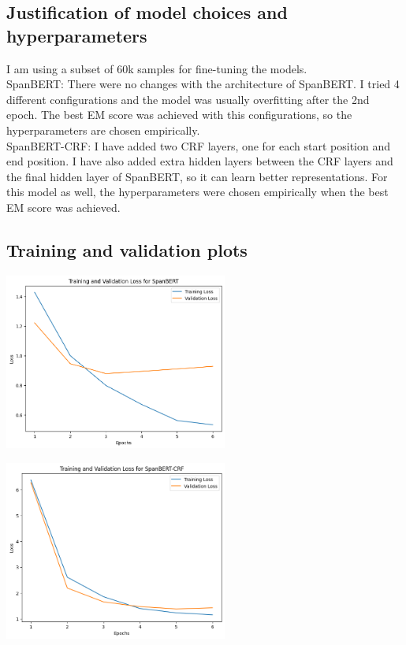 \documentclass{article}
\begin{document}
\subsection{Justification of model choices and hyperparameters}
I am using a subset of 60k samples for fine-tuning the models.
\\
SpanBERT: There were no changes with the architecture of SpanBERT. I tried 4 different configurations and the model was usually overfitting after the 2nd epoch. The best EM score was achieved with this configurations, so the hyperparameters are chosen empirically.
\\
SpanBERT-CRF: I have added two CRF layers, one for each start position and end position. I have also added extra hidden layers between the CRF layers and the final hidden layer of SpanBERT, so it can learn better representations. For this model as well, the hyperparameters were chosen empirically when the best EM score was achieved.

\subsection{Training and validation plots}
\begin{center}
    \includegraphics[width=0.55\textwidth]{spanbert_loss.png}
\end{center}
\begin{center}
    \includegraphics[width=0.55\textwidth]{crf_loss.png}
\end{center}
\end{document}
